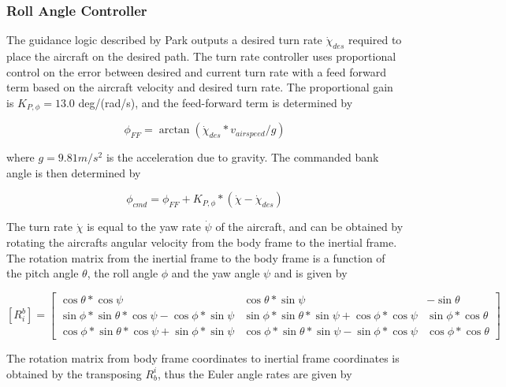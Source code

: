 \documentclass{aiaa}
\begin{document}
\subsubsection{Roll Angle Controller}

The guidance logic described by Park outputs a desired turn rate $\dot{\chi}_{des}$ required to place the aircraft on the desired path. The turn rate controller uses proportional control on the error between desired and current turn rate with a feed forward term based on the aircraft velocity and desired turn rate. The proportional gain is $K_{P,\phi} = 13.0$  deg/(rad/s), and the feed-forward term is determined by


\begin{equation}
	\phi_{FF} = \arctan{(\dot{\chi}_{des}*v_{airspeed}/g)}
\end{equation}

where $g=9.81 m/s^2$ is the acceleration due to gravity. The commanded bank angle is then determined by

\begin{equation}
\label{eqn:rollcmd}
	\phi_{cmd} = \phi_{FF} + K_{P,\phi}*(\dot{\chi} - \dot{\chi}_{des})
\end{equation}

The turn rate $\dot{\chi}$ is equal to the yaw rate $\dot{\psi}$ of the aircraft, and can be obtained by rotating the aircrafts angular velocity from the body frame to the inertial frame. The rotation matrix from the inertial frame to the body frame is a function of the pitch angle $\theta$, the roll angle $\phi$ and the yaw angle $\psi$ and is given by


\begin{equation}
\label{eqn:rot_mat}
[R_i^b] = 
	\begin{bmatrix}
		\cos{\theta}*\cos{\psi} & \cos{\theta}*\sin{\psi} & 					-\sin{\theta}\\
		\sin{\phi}* \sin{\theta}*\cos{\psi} - \cos{\phi}*\sin{\psi} & 			\sin{\phi}* \sin{\theta}*\sin{\psi} + \cos{\phi}*\cos{\psi} & 			\sin{\phi}*\cos{\theta} \\
		\cos{\phi}* \sin{\theta}*\cos{\psi} + \sin{\phi}*\sin{\psi} & 			\cos{\phi}* \sin{\theta}*\sin{\psi} - \sin{\phi}*\cos{\psi} & 			\cos{\phi}*\cos{\theta} 
	\end{bmatrix}
\end{equation}


The rotation matrix from body frame coordinates to inertial frame coordinates is obtained by the transposing $R_b^i$, thus the Euler angle rates are given by
\end{document}
